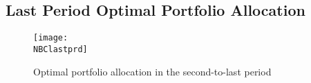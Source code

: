 \subsection{Last Period Optimal Portfolio Allocation}

\begin{figure}[H]
    \centering
    \texttt{[image: \\NBClastprd]}
    \caption{Optimal portfolio allocation in the second-to-last period}
    \label{fig:last_prd_portfolio}
\end{figure}